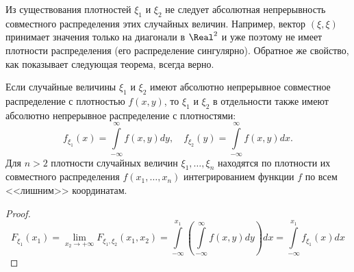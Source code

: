 \begin{rmrk}
    Из существования плотностей $\xi_1$ и $\xi_2$ не следует абсолютная непрерывность совместного распределения этих случайных величин. 
    Например, вектор $(\xi, \xi)$ принимает значения только на диагонали в $\Real^2$ и уже поэтому не имеет плотности распределения (его распределение сингулярно). 
    Обратное же свойство, как показывает следующая теорема, всегда верно.
\end{rmrk}

\begin{thm*}
    Если случайные величины $\xi_1$ и $\xi_2$ имеют абсолютно непрерывное совместное распределение с плотностью $f(x, y)$, то $\xi_1$ и $\xi_2$ в отдельности также имеют абсолютно непрерывное распределение с плотностями:
    \begin{equation*}
        f_{\xi_{1}}(x)=\int\limits_{-\infty}^{\infty} f(x, y) dy, \quad f_{\xi_{2}}(y)=\int\limits_{-\infty}^{\infty} f(x, y) dx.
    \end{equation*}
    Для $n > 2$ плотности случайных величин $\xi_1, \ldots, \xi_n$ находятся по плотности их совместного распределения $f(x_1, \ldots, x_n)$ интегрированием функции $f$ по всем <<лишним>> координатам.
\end{thm*}
\begin{proof}
\begin{equation*}
    F_{\xi_{1}}\left(x_{1}\right)
    = \lim _{x_{2} \to+\infty} F_{\xi_{1}, \xi_{2}}\left(x_{1}, x_{2}\right)
    = \int\limits_{-\infty}^{x_{1}}\left(\int\limits_{-\infty}^{\infty} f(x, y) d y\right) d x
    = \int\limits_{-\infty}^{x_{1}} f_{\xi_{1}}(x) d x
\end{equation*}
\end{proof}

